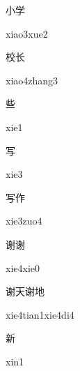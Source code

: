 \begin{verbete}{小学}
\begin{pronuncia}{xiao3xue2}
\end{pronuncia}
\end{verbete}

\begin{verbete}{校长}
\begin{pronuncia}{xiao4zhang3}
\end{pronuncia}
\end{verbete}

\begin{verbete}[xie1]{些}
\begin{pronuncia}{xie1}
\end{pronuncia}
\end{verbete}

\begin{verbete}[xie3]{写}
\begin{pronuncia}{xie3}
\end{pronuncia}
\end{verbete}

\begin{verbete}{写作}
\begin{pronuncia}{xie3zuo4}
\end{pronuncia}
\end{verbete}

\begin{verbete}{谢谢}
\begin{pronuncia}{xie4xie0}
\end{pronuncia}
\end{verbete}

\begin{verbete}{谢天谢地}
\begin{pronuncia}{xie4tian1xie4di4}
\end{pronuncia}
\end{verbete}

\begin{verbete}[xin1]{新}
\begin{pronuncia}{xin1}
\end{pronuncia}
\end{verbete}

